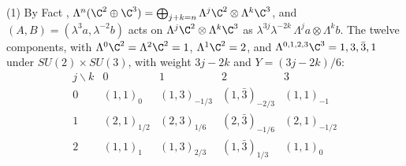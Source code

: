 (1) By Fact , $\Lambda^{n}(\C^{2} \oplus \C^{3}) = \bigoplus_{j+k=n}\Lambda^{j}\C^{2} \otimes \Lambda^{k}\C^{3}$, and $(A, B) = (\lambda^{3}a, \lambda^{-2}b)$ acts on $\Lambda^{j}\C^{2} \otimes \Lambda^{k}\C^{3}$ as $\lambda^{3j}\lambda^{-2k}\,\Lambda^{j}a \otimes \Lambda^{k}b$. The twelve components, with $\Lambda^{0}\C^{2} = \Lambda^{2}\C^{2} = 1$, $\Lambda^{1}\C^{2} = 2$, and $\Lambda^{0,1,2,3}\C^{3} = 1, 3, \bar{3}, 1$ under $SU(2) \times SU(3)$, with weight $3j - 2k$ and $Y = (3j-2k)/6$:
\[
\begin{array}{c|cccc}
j \backslash k & 0 & 1 & 2 & 3 \\ \hline
0 & (1,1)_{0} & (1,3)_{-1/3} & (1,\bar{3})_{-2/3} & (1,1)_{-1} \\
1 & (2,1)_{1/2} & (2,3)_{1/6} & (2,\bar{3})_{-1/6} & (2,1)_{-1/2} \\
2 & (1,1)_{1} & (1,3)_{2/3} & (1,\bar{3})_{1/3} & (1,1)_{0}
\end{array}
\]
